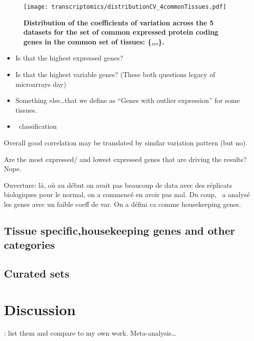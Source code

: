 \begin{figure}[htpb]
    \texttt{[image: transcriptomics/distributionCV\_4commonTissues.pdf]}%
    \centering
    \caption[Coefficient of variation across the datasets for the set of common
expressed genes]{\label{fig:HistCV4T}\textbf{Distribution of the coefficients of
variation across the 5 datasets for the set of common expressed protein coding
genes in the common set of tissues:
\{,,,\}.}}
\end{figure}

\begin{itemize}
    \item Is that the highest expressed genes?
    \item Is that the highest variable genes? (These both questions legacy of microarrays day)
    \item Something else\ldots that we define as \enquote{Genes with outlier expression}
        for some tissues.
    \item \uhlen\ classification
\end{itemize}

Overall good correlation may be translated by similar variation pattern (but no).

Are the most expressed/ and lowest expressed genes that are driving the results? Nope.




Ouverture: là, où au début on avait pas beaucoup de data avec des réplicats
biologiques pour le normal, on a commencé en avoir pas mal. Du coup, \nuno\
a analysé les genes avec un faible coeff de var. On a défini ca comme housekeeping
genes.


\subsection{Tissue specific,housekeeping genes and other categories}\label{subsec:Trans_TissueSpeAndHK}

\subsection{Curated sets}\label{subsec:Trans_curatedSets}



\section{Discussion}\label{sec:Trans_discussion}
: list them and compare to my own
work. Meta-analysis\ldots


